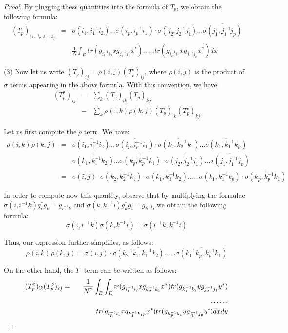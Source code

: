 \documentclass[12pt]{amsbook}
\begin{document}
\begin{proof}
By plugging these quantities into the formula of $T_p$, we obtain the following formula:
\begin{eqnarray*}
(T_p)_{i_1\ldots i_p,j_1\ldots j_p}
&=&\overline{\sigma(i_1,i_1^{-1}i_2)}\ldots\overline{\sigma(i_p,i_p^{-1}i_1)}\cdot\overline{\sigma(j_2,j_2^{-1}j_1)}\ldots\overline{\sigma(j_1,j_1^{-1}j_p)}\\
&&\frac{1}{N}\int_Etr(g_{i_1^{-1}i_2}xg_{j_2^{-1}j_1}x^*)\ldots\ldots tr(g_{i_p^{-1}i_1}xg_{j_1^{-1}j_p}x^*)dx
\end{eqnarray*}

(3) Now let us write $(T_p)_{ij}=\rho(i,j)(T_p^\circ)_{ij}$, where $\rho(i,j)$ is the product of $\sigma$ terms appearing in the above formula. With this convention, we have:
\begin{eqnarray*}
(T_p^2)_{ij}
&=&\sum_k(T_p)_{ik}(T_p)_{kj}\\
&=&\sum_k\rho(i,k)\rho(k,j)(T_p^\circ)_{ik}(T_p^\circ)_{kj}
\end{eqnarray*}

Let us first compute the $\rho$ term. We have:
\begin{eqnarray*}
\rho(i,k)\rho(k,j)
&=&\overline{\sigma(i_1,i_1^{-1}i_2)}\ldots\overline{\sigma(i_p,i_p^{-1}i_1)}\cdot\overline{\sigma(k_2,k_2^{-1}k_1)}\ldots\overline{\sigma(k_1,k_1^{-1}k_p)}\\
&&\overline{\sigma(k_1,k_1^{-1}k_2)}\ldots\overline{\sigma(k_p,k_p^{-1}k_1)}\cdot\overline{\sigma(j_2,j_2^{-1}j_1)}\ldots\overline{\sigma(j_1,j_1^{-1}j_p)}\\
&=&\sigma(i,j)\cdot\overline{\sigma(k_2,k_2^{-1}k_1)}\cdot\overline{\sigma(k_1,k_1^{-1}k_2)}\ldots\ldots\overline{\sigma(k_1,k_1^{-1}k_p)}\cdot\overline{\sigma(k_p,k_p^{-1}k_1)}
\end{eqnarray*}

In order to compute now this quantity, observe that by multiplying the formulae $\sigma(i,i^{-1}k)g_i^*g_k=g_{i^{-1}k}$ and $\sigma(k,k^{-1}i)g_k^*g_i=g_{k^{-1}i}$ we obtain the following formula:
$$\sigma(i,i^{-1}k)\sigma(k,k^{-1}i)=\sigma(i^{-1}k,k^{-1}i)$$

Thus, our expression further simplifies, as follows:
$$\rho(i,k)\rho(k,j)=\sigma(i,j)\cdot\overline{\sigma(k_2^{-1}k_1,k_1^{-1}k_2)}\ldots\ldots\overline{\sigma(k_1^{-1}k_p,k_p^{-1}k_1)}$$

On the other hand, the $T^\circ$ term can be written as follows:
\begin{eqnarray*}
(T_p^\circ)_{ik}(T_p^\circ)_{kj}
&=&\frac{1}{N^2}\int_E\int_Etr(g_{i_1^{-1}i_2}xg_{k_2^{-1}k_1}x^*)tr(g_{k_1^{-1}k_2}yg_{j_2^{-1}j_1}y^*)\\
&&\hskip40mm\ldots\ldots\\
&&\hskip10mm tr(g_{i_p^{-1}i_1}xg_{k_1^{-1}k_1p}x^*)tr(g_{k_p^{-1}k_1}yg_{j_1^{-1}j_p}y^*)dxdy
\end{eqnarray*}


\end{proof}
\end{document}
